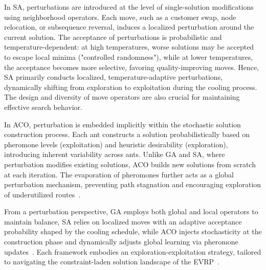 In SA, perturbations are introduced at the level of single-solution modifications using neighborhood operators. Each move, such as a customer swap, node relocation, or subsequence reversal, induces a localized perturbation around the current solution. The acceptance of perturbations is probabilistic and temperature-dependent: at high temperatures, worse solutions may be accepted to escape local minima ("controlled randomness"), while at lower temperatures, the acceptance becomes more selective, favoring quality-improving moves. Hence, SA primarily conducts localized, temperature-adaptive perturbations, dynamically shifting from exploration to exploitation during the cooling process. The design and diversity of move operators are also crucial for maintaining effective search behavior.

In ACO, perturbation is embedded implicitly within the stochastic solution construction process. Each ant constructs a solution probabilistically based on pheromone levels (exploitation) and heuristic desirability (exploration), introducing inherent variability across ants. Unlike GA and SA, where perturbation modifies existing solutions, ACO builds new solutions from scratch at each iteration. The evaporation of pheromones further acts as a global perturbation mechanism, preventing path stagnation and encouraging exploration of underutilized routes~\cite{comert2023new}.

From a perturbation perspective, GA employs both global and local operators to maintain balance, SA relies on localized moves with an adaptive acceptance probability shaped by the cooling schedule, while ACO injects stochasticity at the construction phase and dynamically adjusts global learning via pheromone updates~\cite{li2022overview}. Each framework embodies an exploration-exploitation strategy, tailored to navigating the constraint-laden solution landscape of the EVRP~\cite{sabet2022green,matijevic2023metaheuristic}.



